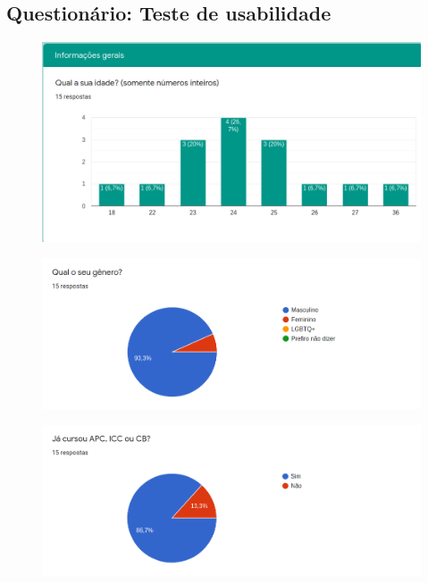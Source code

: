 \begin{apendicesenv}

\partapendices

\chapter{Questionário: Teste de usabilidade}
\label{apenda}


\begin{figure}[h]
	\centering
	\includegraphics[keepaspectratio=true,scale=0.9]{figuras/j1.png}
\end{figure}

\begin{figure}[h]
	\centering
	\includegraphics[keepaspectratio=true,scale=0.9]{figuras/j2.png}
\end{figure}

\begin{figure}[h]
	\centering
	\includegraphics[keepaspectratio=true,scale=0.9]{figuras/j3.png}
\end{figure}


\end{apendicesenv}
